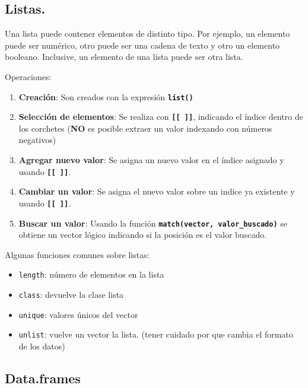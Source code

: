 \documentclass[]{book}
\begin{document}
\hypertarget{listas.}{%
\subsection{Listas.}\label{listas.}}

Una lista puede contener elementos de distinto tipo. Por ejemplo, un elemento puede ser numérico, otro puede ser una cadena de texto y otro un elemento booleano. Inclusive, un elemento de una lista puede ser otra lista.

Operaciones:

\begin{enumerate}
\def\labelenumi{\arabic{enumi}.}
\item
  \textbf{Creación}: Son creados con la expresión \textbf{\texttt{list()}}
\item
  \textbf{Selección de elementos}: Se realiza con \textbf{\texttt{{[}{[}\ {]}{]}}}, indicando el índice dentro de los corchetes (\textbf{NO} es posible extraer un valor indexando con números negativos)
\item
  \textbf{Agregar nuevo valor}: Se asigna un nuevo valor en el índice asignado y usando \textbf{\texttt{{[}{[}\ {]}{]}}}.
\item
  \textbf{Cambiar un valor}: Se asigna el nuevo valor sobre un indice ya existente y usando \textbf{\texttt{{[}{[}\ {]}{]}}}.
\item
  \textbf{Buscar un valor}: Usando la función \textbf{\texttt{match(vector,\ valor\_buscado)}} se obtiene un vector lógico indicando si la posición es el valor buscado.
\end{enumerate}

Algunas funciones comunes sobre listas:

\begin{itemize}
\item
  \texttt{length}: número de elementos en la lista
\item
  \texttt{class}: devuelve la clase lista
\item
  \texttt{unique}: valores únicos del vector
\item
  \texttt{unlist}: vuelve un vector la lista. (tener cuidado por que cambia el formato de los datos)
\end{itemize}

\hypertarget{data.frames}{%
\subsection{Data.frames}\label{data.frames}}
\end{document}
